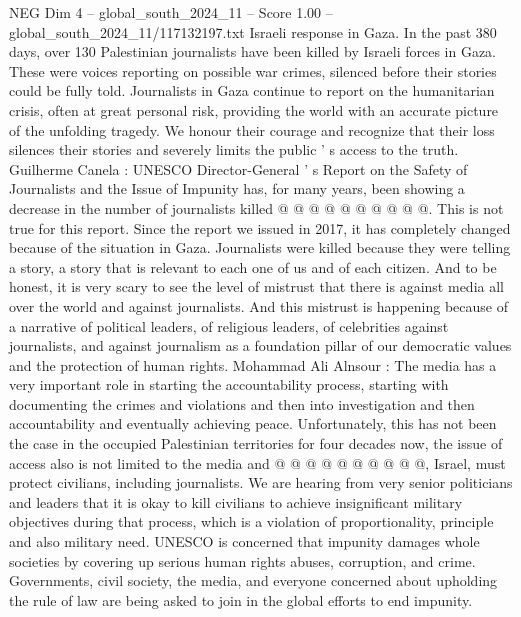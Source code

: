 \begin{textsample}{NEG Dim 4 – global\_south\_2024\_11 – Score 1.00 – global\_south\_2024\_11/117132197.txt}
Israeli response in Gaza.
In the past 380 days, over 130 Palestinian journalists have been killed by Israeli forces in Gaza.
These were voices reporting on possible war crimes, silenced before their stories could be fully told.
Journalists in Gaza continue to report on the humanitarian crisis, often at great personal risk, providing the world with an accurate picture of the unfolding tragedy.
We honour their courage and recognize that their loss silences their stories and severely limits the public ' s access to the truth.
Guilherme Canela : UNESCO Director-General ' s Report on the Safety of Journalists and the Issue of Impunity has, for many years, been showing a decrease in the number of journalists killed @ @ @ @ @ @ @ @ @ @.
This is not true for this report.
Since the report we issued in 2017, it has completely changed because of the situation in Gaza.
Journalists were killed because they were telling a story, a story that is relevant to each one of us and of each citizen.
And to be honest, it is very scary to see the level of mistrust that there is against media all over the world and against journalists.
And this mistrust is happening because of a narrative of political leaders, of religious leaders, of celebrities against journalists, and against journalism as a foundation pillar of our democratic values and the protection of human rights.
Mohammad Ali Alnsour : The media has a very important role in starting the accountability process, starting with documenting the crimes and violations and then into investigation and then accountability and eventually achieving peace.
Unfortunately, this has not been the case in the occupied Palestinian territories for four decades now, the issue of access also is not limited to the media and @ @ @ @ @ @ @ @ @ @, Israel, must protect civilians, including journalists.
We are hearing from very senior politicians and leaders that it is okay to kill civilians to achieve insignificant military objectives during that process, which is a violation of proportionality, principle and also military need.
UNESCO is concerned that impunity damages whole societies by covering up serious human rights abuses, corruption, and crime.
Governments, civil society, the media, and everyone concerned about upholding the rule of law are being asked to join in the global efforts to end impunity.

\end{textsample}
